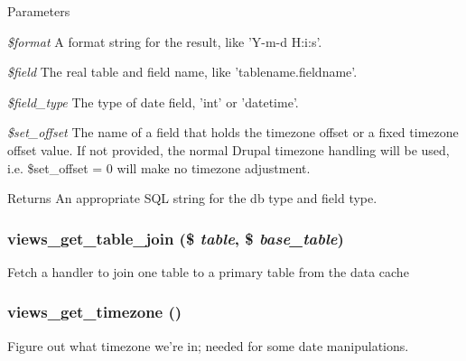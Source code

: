 \begin{DoxyParams}{Parameters}
\item[{\em \$format}]A format string for the result, like 'Y-\/m-\/d H:i:s'. \item[{\em \$field}]The real table and field name, like 'tablename.fieldname'. \item[{\em \$field\_\-type}]The type of date field, 'int' or 'datetime'. \item[{\em \$set\_\-offset}]The name of a field that holds the timezone offset or a fixed timezone offset value. If not provided, the normal Drupal timezone handling will be used, i.e. \$set\_\-offset = 0 will make no timezone adjustment. \end{DoxyParams}
\begin{DoxyReturn}{Returns}
An appropriate SQL string for the db type and field type. 
\end{DoxyReturn}
\hypertarget{handlers_8inc_a76ba5af63134db1102702696a50ba6f5}{
\subsubsection[{views\_\-get\_\-table\_\-join}]{\setlength{\rightskip}{0pt plus 5cm}views\_\-get\_\-table\_\-join (\$ {\em table}, \/  \$ {\em base\_\-table})}}
\label{handlers_8inc_a76ba5af63134db1102702696a50ba6f5}
Fetch a handler to join one table to a primary table from the data cache \hypertarget{handlers_8inc_a3bd8b0bf769dc6d068349b222edb410c}{
\subsubsection[{views\_\-get\_\-timezone}]{\setlength{\rightskip}{0pt plus 5cm}views\_\-get\_\-timezone ()}}
\label{handlers_8inc_a3bd8b0bf769dc6d068349b222edb410c}
Figure out what timezone we're in; needed for some date manipulations. 